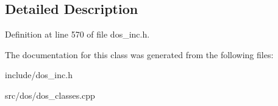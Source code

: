 \subsection{Detailed Description}


Definition at line 570 of file dos\-\_\-inc.\-h.



The documentation for this class was generated from the following files\-:\begin{DoxyCompactItemize}
\item 
include/dos\-\_\-inc.\-h\item 
src/dos/dos\-\_\-classes.\-cpp\end{DoxyCompactItemize}
